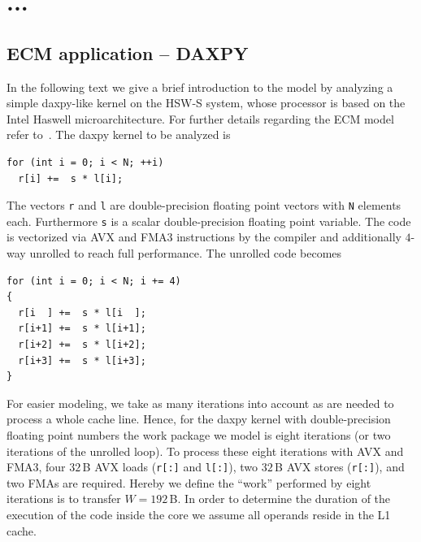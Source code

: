 \section{...}


\subsection{ECM application -- DAXPY}
\label{sec:epm}


In the following text we give a brief introduction to the model by analyzing a
simple daxpy-like kernel on the HSW-S system, whose processor is based on the Intel Haswell
microarchitecture. For further details regarding the ECM model refer
to~\cite{stengel-2015}.  The daxpy kernel to be analyzed is
%
\begin{lstlisting}
for (int i = 0; i < N; ++i) 
  r[i] +=  s * l[i];
\end{lstlisting}
%
The vectors \verb'r' and \verb'l' are double-precision floating point vectors
with \verb'N' elements each. 
Furthermore \verb's' is a scalar double-precision floating point variable.
%
The code is vectorized via AVX and FMA3 instructions by the compiler and
additionally $4$-way unrolled to reach full performance.
The unrolled code becomes
\begin{lstlisting}
for (int i = 0; i < N; i += 4)
{
  r[i  ] +=  s * l[i  ];
  r[i+1] +=  s * l[i+1];
  r[i+2] +=  s * l[i+2];
  r[i+3] +=  s * l[i+3];
}
\end{lstlisting}
%
For easier modeling, we take as many iterations into account as are needed to
process a whole cache line.
Hence, for the daxpy kernel with double-precision floating point numbers the
work package we model is eight iterations (or two iterations of the unrolled loop).
%
To process these eight iterations with AVX and FMA3, four $32$\,B AVX loads (\verb|r[:]| and
\verb|l[:]|), two
$32$\,B AVX stores (\verb'r[:]'), and two FMAs are required.
%
Hereby we define the ``work'' performed by eight iterations is to transfer $W = 192$\,B.
%
In order to determine the duration of the execution of the code inside
the core we assume all operands reside in the L1 cache.

